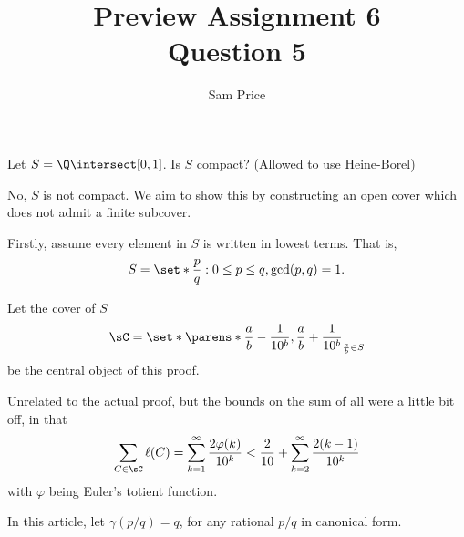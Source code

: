 \documentclass{article}
\author{Sam Price}
\date{}
\title{Preview Assignment 6\\\Large{Question 5}}
\newcommand{\Rt}[1]{\dfrac{1}{10^{#1}}}
\begin{document}
\maketitle

Let $S = \Q \intersect [0, 1]$. Is $S$ compact? (Allowed to use Heine-Borel)
\vspace{0.5cm}

No, $S$ is not compact. We aim to show this by constructing an open cover which does not admit a finite subcover.

Firstly, assume every element in $S$ is written in lowest terms. That is,
\[ S = \set*{\frac{p}{q} : 0 \le p \le q, \gcd(p, q) = 1 }. \]

Let the cover of $S$
\[ \sC = \set*{\parens*{\frac{a}{b} - \Rt{b}, \frac{a}{b} + \Rt{b}}}_{\frac{a}{b} \in S} \]
be the central object of this proof.

Unrelated to the actual proof, but the bounds on the sum of all were a little bit off, in that
\[
  \sum_{C \in \sC} \ell(C) = \sum_{k = 1}^{\infty}\frac{2\varphi(k)}{10^{k}}
  < \frac{2}{10} + \sum_{k = 2}^{\infty}\frac{2(k - 1)}{10^{k}}
\]
with $\varphi$ being Euler's totient function.

In this article, let $\gamma(p/q) = q$, for any rational $p/q$ in canonical form.
\end{document}
